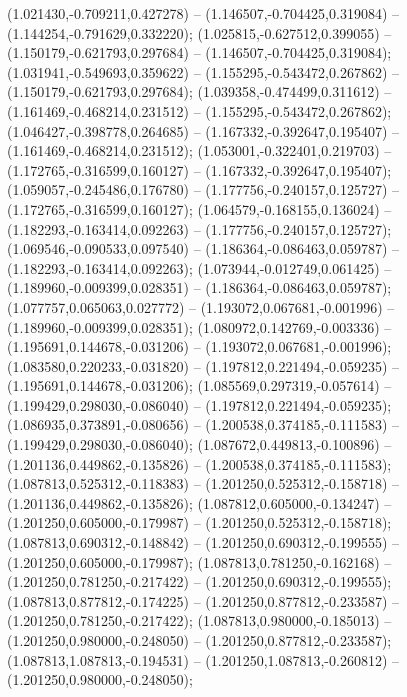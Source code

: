  (1.021430,-0.709211,0.427278) -- (1.146507,-0.704425,0.319084) -- (1.144254,-0.791629,0.332220);
 (1.025815,-0.627512,0.399055) -- (1.150179,-0.621793,0.297684) -- (1.146507,-0.704425,0.319084);
 (1.031941,-0.549693,0.359622) -- (1.155295,-0.543472,0.267862) -- (1.150179,-0.621793,0.297684);
 (1.039358,-0.474499,0.311612) -- (1.161469,-0.468214,0.231512) -- (1.155295,-0.543472,0.267862);
 (1.046427,-0.398778,0.264685) -- (1.167332,-0.392647,0.195407) -- (1.161469,-0.468214,0.231512);
 (1.053001,-0.322401,0.219703) -- (1.172765,-0.316599,0.160127) -- (1.167332,-0.392647,0.195407);
 (1.059057,-0.245486,0.176780) -- (1.177756,-0.240157,0.125727) -- (1.172765,-0.316599,0.160127);
 (1.064579,-0.168155,0.136024) -- (1.182293,-0.163414,0.092263) -- (1.177756,-0.240157,0.125727);
 (1.069546,-0.090533,0.097540) -- (1.186364,-0.086463,0.059787) -- (1.182293,-0.163414,0.092263);
 (1.073944,-0.012749,0.061425) -- (1.189960,-0.009399,0.028351) -- (1.186364,-0.086463,0.059787);
 (1.077757,0.065063,0.027772) -- (1.193072,0.067681,-0.001996) -- (1.189960,-0.009399,0.028351);
 (1.080972,0.142769,-0.003336) -- (1.195691,0.144678,-0.031206) -- (1.193072,0.067681,-0.001996);
 (1.083580,0.220233,-0.031820) -- (1.197812,0.221494,-0.059235) -- (1.195691,0.144678,-0.031206);
 (1.085569,0.297319,-0.057614) -- (1.199429,0.298030,-0.086040) -- (1.197812,0.221494,-0.059235);
 (1.086935,0.373891,-0.080656) -- (1.200538,0.374185,-0.111583) -- (1.199429,0.298030,-0.086040);
 (1.087672,0.449813,-0.100896) -- (1.201136,0.449862,-0.135826) -- (1.200538,0.374185,-0.111583);
 (1.087813,0.525312,-0.118383) -- (1.201250,0.525312,-0.158718) -- (1.201136,0.449862,-0.135826);
 (1.087812,0.605000,-0.134247) -- (1.201250,0.605000,-0.179987) -- (1.201250,0.525312,-0.158718);
 (1.087813,0.690312,-0.148842) -- (1.201250,0.690312,-0.199555) -- (1.201250,0.605000,-0.179987);
 (1.087813,0.781250,-0.162168) -- (1.201250,0.781250,-0.217422) -- (1.201250,0.690312,-0.199555);
 (1.087813,0.877812,-0.174225) -- (1.201250,0.877812,-0.233587) -- (1.201250,0.781250,-0.217422);
 (1.087813,0.980000,-0.185013) -- (1.201250,0.980000,-0.248050) -- (1.201250,0.877812,-0.233587);
 (1.087813,1.087813,-0.194531) -- (1.201250,1.087813,-0.260812) -- (1.201250,0.980000,-0.248050);
